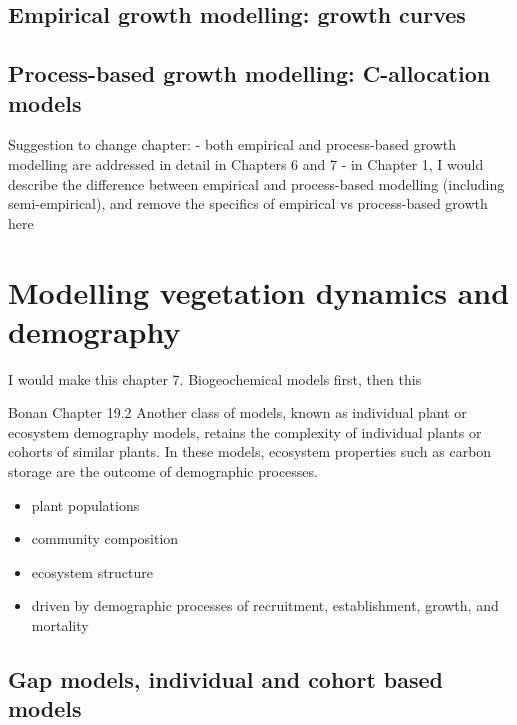 \documentclass[
  oneside]{book}
\providecommand{\tightlist}{%
  \setlength{\itemsep}{0pt}\setlength{\parskip}{0pt}}
\begin{document}

\hypertarget{empirical-growth-modelling-growth-curves}{%
\section{Empirical growth modelling: growth curves}\label{empirical-growth-modelling-growth-curves}}

\hypertarget{process-based-growth-modelling-c-allocation-models}{%
\section{Process-based growth modelling: C-allocation models}\label{process-based-growth-modelling-c-allocation-models}}

Suggestion to change chapter:
- both empirical and process-based growth modelling are addressed in detail in Chapters 6 and 7
- in Chapter 1, I would describe the difference between empirical and process-based modelling (including semi-empirical), and remove the specifics of empirical vs process-based growth here

\hypertarget{modelling-vegetation-dynamics-and-demography}{%
\chapter{Modelling vegetation dynamics and demography}\label{modelling-vegetation-dynamics-and-demography}}


I would make this chapter 7.
Biogeochemical models first, then this

Bonan Chapter 19.2
Another class of models, known as individual plant or ecosystem demography models, retains the complexity of individual plants or cohorts of similar plants. In these models, ecosystem properties such as carbon storage are the outcome of demographic processes.

\begin{itemize}
\tightlist
\item
  plant populations
\item
  community composition
\item
  ecosystem structure
\item
  driven by demographic processes of recruitment, establishment, growth, and mortality
\end{itemize}

\hypertarget{gap-models-individual-and-cohort-based-models}{%
\section{Gap models, individual and cohort based models}\label{gap-models-individual-and-cohort-based-models}}
\end{document}
